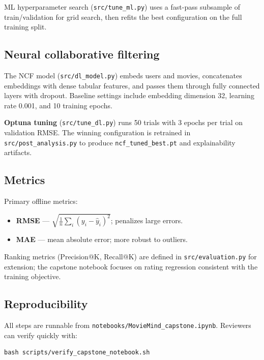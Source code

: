 ML hyperparameter search (\texttt{src/tune\_ml.py}) uses a fast-pass subsample of train/validation for
grid search, then refits the best configuration on the full training split.

\subsection{Neural collaborative filtering}

The NCF model (\texttt{src/dl\_model.py}) embeds users and movies, concatenates embeddings with dense
tabular features, and passes them through fully connected layers with dropout.
Baseline settings include embedding dimension 32, learning rate 0.001, and 10 training epochs.

\textbf{Optuna tuning} (\texttt{src/tune\_dl.py}) runs 50 trials with 3 epochs per trial on validation RMSE.
The winning configuration is retrained in \texttt{src/post\_analysis.py} to produce
\texttt{ncf\_tuned\_best.pt} and explainability artifacts.

\subsection{Metrics}

Primary offline metrics:
\begin{itemize}
  \item \textbf{RMSE} --- $\sqrt{\frac{1}{n}\sum_i (y_i - \hat{y}_i)^2}$; penalizes large errors.
  \item \textbf{MAE} --- mean absolute error; more robust to outliers.
\end{itemize}

Ranking metrics (Precision@K, Recall@K) are defined in \texttt{src/evaluation.py} for extension; the
capstone notebook focuses on rating regression consistent with the training objective.

\subsection{Reproducibility}

All steps are runnable from \texttt{notebooks/MovieMind\_capstone.ipynb}.
Reviewers can verify quickly with:
\begin{verbatim}
bash scripts/verify_capstone_notebook.sh
\end{verbatim}
